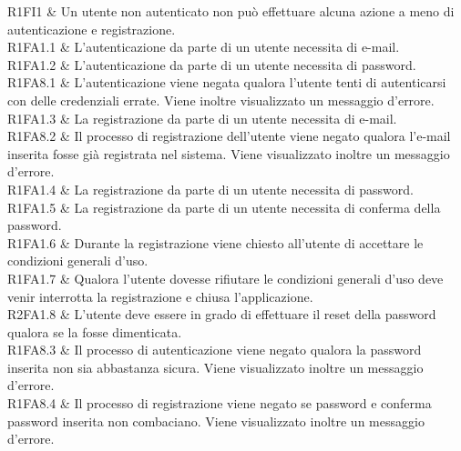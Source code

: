 R1FI1 & Un utente non autenticato non può effettuare alcuna azione a meno di autenticazione e registrazione.\\

R1FA1.1 & L'autenticazione da parte di un utente necessita di e-mail.\\

R1FA1.2 & L'autenticazione da parte di un utente necessita di password. \\

R1FA8.1 & L'autenticazione viene negata qualora l'utente tenti di autenticarsi con delle credenziali errate. Viene inoltre visualizzato un messaggio d'errore.\\

R1FA1.3 & La registrazione da parte di un utente necessita di e-mail.\\

R1FA8.2 & Il processo di registrazione dell'utente viene negato qualora l'e-mail inserita fosse già registrata nel sistema. Viene visualizzato inoltre un messaggio d'errore.\\

R1FA1.4 & La registrazione da parte di un utente necessita di password.\\

R1FA1.5 & La registrazione da parte di un utente necessita di conferma della password.\\

R1FA1.6 & Durante la registrazione viene chiesto all'utente di accettare le condizioni generali d'uso.\\

R1FA1.7 & Qualora l'utente dovesse rifiutare le condizioni generali d'uso deve venir interrotta la registrazione e chiusa l'applicazione.\\

R2FA1.8 & L'utente deve essere in grado di effettuare il reset della password qualora se la fosse dimenticata.\\

R1FA8.3 & Il processo di autenticazione viene negato qualora la password inserita non sia abbastanza sicura. Viene visualizzato inoltre un messaggio d'errore.\\

R1FA8.4 & Il processo di registrazione viene negato se password e conferma password inserita non combaciano. Viene visualizzato inoltre un messaggio d'errore.\\


